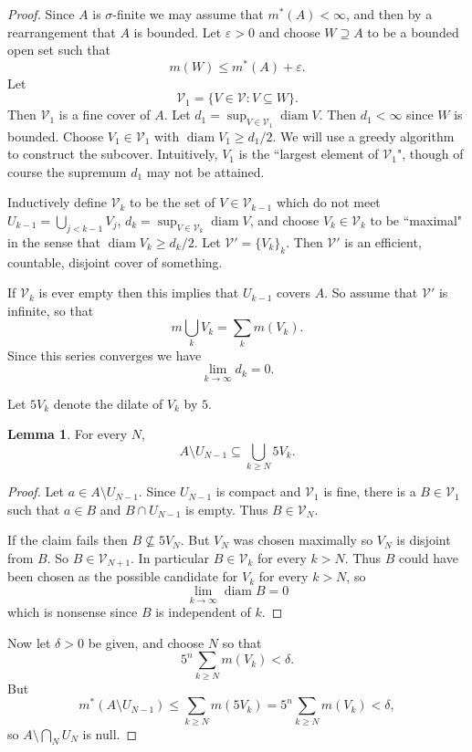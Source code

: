 \documentclass[12pt]{report}
\newcommand{\diam}{\operatorname{diam}}
\theoremstyle{definition}
\newtheorem{lemma}[theorem]{Lemma}
\begin{document}
\begin{proof}
Since $A$ is $\sigma$-finite we may assume that $m^*(A) < \infty$, and then by a rearrangement that $A$ is bounded.
Let $\varepsilon > 0$ and choose $W \supseteq A$ to be a bounded open set such that
$$m(W) \leq m^*(A) + \varepsilon.$$
Let
$$\mathcal V_1 = \{V \in \mathcal V: V \subseteq W\}.$$
Then $\mathcal V_1$ is a fine cover of $A$.
Let $d_1 = \sup_{V \in \mathcal V_1} \diam V$. Then $d_1 < \infty$ since $W$ is bounded.
Choose $V_1 \in \mathcal V_1$ with $\diam V_1 \geq d_1/2$.
We will use a greedy algorithm to construct the subcover. Intuitively, $V_1$ is the ``largest element of $\mathcal V_1$", though of course the supremum $d_1$ may not be attained.

Inductively define $\mathcal V_k$ to be the set of $V \in \mathcal V_{k-1}$ which do not meet $U_{k-1} = \bigcup_{j < k-1} V_j$,
$d_k = \sup_{V \in \mathcal V_k} \diam V$, and choose $V_k \in \mathcal V_k$ to be ``maximal" in the sense that $\diam V_k \geq d_k/2$.
Let $\mathcal V' = \{V_k\}_k$.
Then $\mathcal V'$ is an efficient, countable, disjoint cover of something.

If $\mathcal V_k$ is ever empty then this implies that $U_{k-1}$ covers $A$.
So assume that $\mathcal V'$ is infinite, so that
$$m\bigcup_k V_k = \sum_k m(V_k).$$
Since this series converges we have
$$\lim_{k \to \infty} d_k = 0.$$

Let $5V_k$ denote the dilate of $V_k$ by $5$.
\begin{lemma}
For every $N$,
$$A \setminus U_{N-1} \subseteq \bigcup_{k \geq N} 5V_k.$$
\end{lemma}
\begin{proof}
Let $a \in A \setminus U_{N-1}$. Since $U_{N-1}$ is compact and $\mathcal V_1$ is fine, there is a $B \in \mathcal V_1$ such that $a \in B$ and $B \cap U_{N-1}$ is empty.
Thus $B \in \mathcal V_N$.

If the claim fails then $B \not \subseteq 5V_N$. But $V_N$ was chosen maximally so $V_N$ is disjoint from $B$. So $B \in \mathcal V_{N+1}$. In particular $B \in \mathcal V_k$ for every $k > N$.
Thus $B$ could have been chosen as the possible candidate for $V_k$ for every $k > N$, so
$$\lim_{k \to \infty} \diam B = 0$$
which is nonsense since $B$ is independent of $k$.
\end{proof}
Now let $\delta > 0$ be given, and choose $N$ so that
$$5^n \sum_{k \geq N} m(V_k) < \delta.$$
But
$$m^*(A \setminus U_{N-1}) \leq \sum_{k \geq N} m(5V_k) = 5^n \sum_{k \geq N} m(V_k) < \delta,$$
so $A \setminus \bigcap_N U_N$ is null.
\end{proof}
\end{document}
